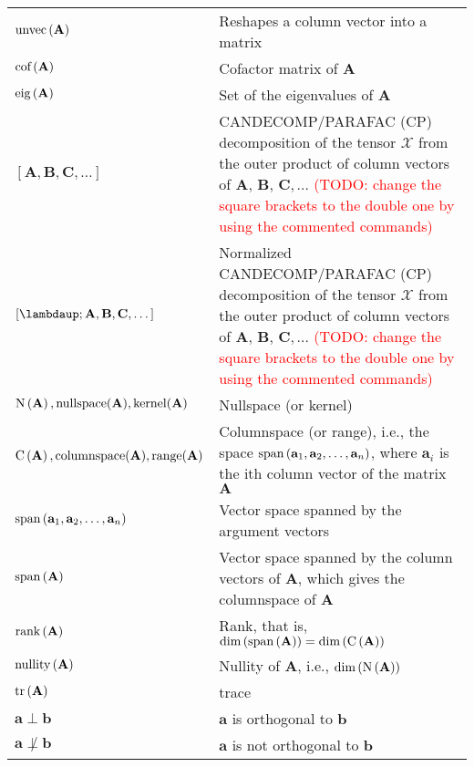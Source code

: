 \documentclass{article}
\newcommand{\tr}[1]{\ensuremath{\textnormal{tr}\left(#1\right)}} %
\newcommand{\cof}[1]{\ensuremath{\textnormal{cof}\left(#1\right)}} %
\newcommand{\eig}[1]{\ensuremath{\textnormal{eig}\left(#1\right)}} %
\renewcommand{\dim}[1]{\ensuremath{\textnormal{dim}\left(#1\right)}} %
\newcommand{\nullspace}[1]{\ensuremath{\textnormal{N}\left(#1\right)}} %
\newcommand{\nullity}[1]{\ensuremath{\textnormal{nullity}\left(#1\right)}} %
\renewcommand{\span}[1]{\ensuremath{\textnormal{span}\left(#1\right)}} %
\newcommand{\range}[1]{\ensuremath{\textnormal{C}\left(#1\right)}} %
\newcommand{\rank}[1]{\ensuremath{\textnormal{rank}\left(#1\right)}} %
\newcommand{\unvec}[1]{\ensuremath{\textnormal{unvec}\left(#1\right)}} %
\newcommand{\obs}[1]{\textcolor{red}{(#1)}} %
\begin{document}
\begin{xltabular}{\textwidth}{XX}
    \(\unvec{\mathbf{A}}\)& Reshapes a column vector into a matrix\\
    \(\cof{\mathbf{A}}\) & Cofactor matrix of \(\mathbf{A}\)\\
    \(\eig{\mathbf{A}}\) & Set of the eigenvalues of \(\mathbf{A}\)\\
    \(\left[ \mathbf{A}, \mathbf{B}, \mathbf{C}, \dots \right]\) & CANDECOMP/PARAFAC (CP) decomposition of the tensor \(\bm{\mathcal{X}}\) from the outer product of column vectors of \(\mathbf{A}\), \(\mathbf{B}\), \(\mathbf{C}, \dots\) \obs{TODO: change the square brackets to the double one by using the commented commands} \\ %
    \(\left[ \boldsymbol{\lambdaup}; \mathbf{A}, \mathbf{B}, \mathbf{C}, \dots \right]\) & Normalized CANDECOMP/PARAFAC (CP) decomposition of the tensor \(\bm{\mathcal{X}}\) from the outer product of column vectors of \(\mathbf{A}\), \(\mathbf{B}\), \(\mathbf{C}, \dots\) \obs{TODO: change the square brackets to the double one by using the commented commands} \\ %
    \(\nullspace{\mathbf{A}}, \mathrm{nullspace}(\mathbf{A}), \mathrm{kernel}(\mathbf{A})\) & Nullspace (or kernel)\\
    \(\range{\mathbf{A}}, \mathrm{columnspace}(\mathbf{A}), \mathrm{range}(\mathbf{A})\) & Columnspace (or range), i.e., the space \(\span{\mathbf{a}_1,\mathbf{a}_2, \dots, \mathbf{a}_n}\), where \(\mathbf{a}_i\) is the ith column vector of the matrix \(\mathbf{A}\)\\
    \(\span{\mathbf{a}_1, \mathbf{a}_2, \dots, \mathbf{a}_n}\) & Vector space spanned by the argument vectors\\
    \(\span{\mathbf{A}}\) & Vector space spanned by the column vectors of \(\mathbf{A}\), which gives the columnspace of \(\mathbf{A}\)\\
    \(\rank{\mathbf{A}}\) & Rank, that is, \(\dim{\span{\mathbf{A}}} = \dim{\range{\mathbf{A}}}\)\\
    \(\nullity{\mathbf{A}}\) & Nullity of \(\mathbf{A}\), i.e., \(\dim{\nullspace{\mathbf{A}}}\)\\
    \(\tr{\mathbf{A}}\)& trace\\
    \(\mathbf{a} \perp \mathbf{b}\) & \(\mathbf{a}\) is orthogonal to \(\mathbf{b}\)\\
    \(\mathbf{a} \not\perp \mathbf{b}\) & \(\mathbf{a}\) is not orthogonal to \(\mathbf{b}\)\\

\end{xltabular}
\end{document}

